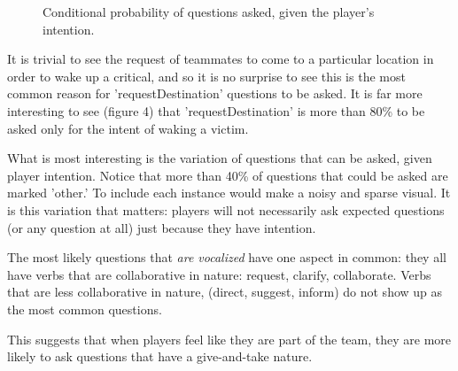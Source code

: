 \begin{figure}[h!]
    \centering
    \caption{Conditional probability of questions asked, given the player's intention.}
\end{figure}

It is trivial to see the request of teammates to come to a particular location in order to wake up a critical, and so it is no surprise to see this is the most common reason for 'requestDestination' questions to be asked. It is far more interesting to see (figure 4) that 'requestDestination' is more than 80\% to be asked only for the intent of waking a victim.

What is most interesting is the variation of questions that can be asked, given player intention. Notice that more than 40\% of questions that could be asked are marked 'other.' To include each instance would make a noisy and sparse visual. It is this variation that matters: players will not necessarily ask expected questions (or any question at all) just because they have intention. 

The most likely questions that \emph{are vocalized} have one aspect in common: they all have verbs that are collaborative in nature: request, clarify, collaborate. Verbs that are less collaborative in nature, (direct, suggest, inform) do not show up as the most common questions.

This suggests that when players feel like they are part of the team, they are more likely to ask questions that have a give-and-take nature.

\clearpage


